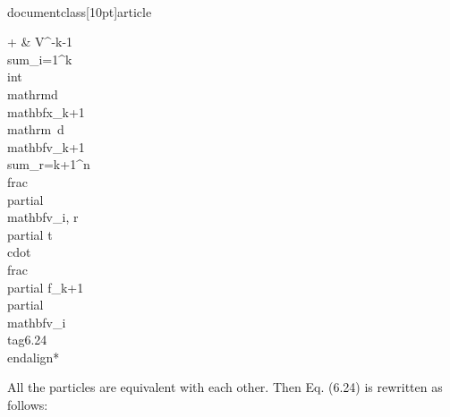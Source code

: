 \\documentclass[10pt]{article}
\begin{document}
{{{{+ & V^{-k-1} \\sum_{i=1}^{k} \\int \\mathrm{d} \\mathbf{x}_{k+1} \\mathrm{~d} \\mathbf{v}_{k+1} \\sum_{r=k+1}^{n} \\frac{\\partial \\mathbf{v}_{i, r}}{\\partial t} \\cdot \\frac{\\partial f_{k+1}}{\\partial \\mathbf{v}_{i}} \\tag{6.24}
\\end{align*}


All the particles are equivalent with each other. Then Eq. (6.24) is rewritten as follows:


}}}}
\end{document}
